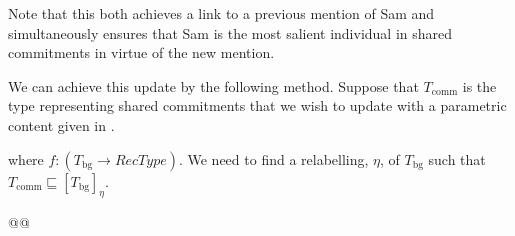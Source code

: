 Note that this both achieves a link to a previous mention of Sam and
simultaneously ensures that Sam is the most salient individual in
shared commitments in virtue of the new mention.


We can achieve this update by the following method.  Suppose that $T_{\mathrm{comm}}$ is the
type representing shared commitments that we wish to update with a
parametric content given in \nexteg{}.
\begin{ex}
\end{ex}
where $f:(T_{\mathrm{bg}}\rightarrow\textit{RecType})$.  %
We
need to find a relabelling, $\eta$, of 
$T_{\mathrm{bg}}$ such that $T_{\mathrm{comm}}\sqsubseteq[T_{\mathrm{bg}}]_\eta$.

@@

